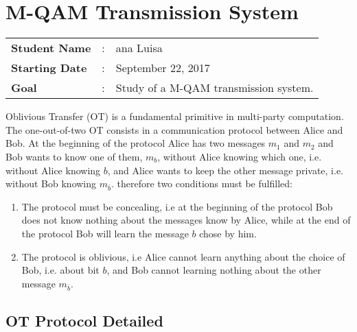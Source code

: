 \clearpage
\section{M-QAM Transmission System}

\begin{tcolorbox}	
\begin{tabular}{p{2.75cm} p{0.2cm} p{10.5cm}} 	
\textbf{Student Name}  &:& ana Luisa\\
\textbf{Starting Date} &:& September 22, 2017\\
\textbf{Goal}          &:& Study of a M-QAM transmission system.
\end{tabular}
\end{tcolorbox}

Oblivious Transfer (OT) is a fundamental primitive in multi-party computation. The one-out-of-two OT consists in a communication protocol between Alice and Bob. At the beginning of the protocol Alice has two messages $m_1$ and $m_2$ and Bob wants to know one of them, $m_b$, without Alice knowing which one, i.e. without Alice knowing $b$, and Alice wants to keep the other message private, i.e. without Bob knowing $m_{\bar{b}}$. therefore two conditions must be fulfilled:
\begin{enumerate}
	\item{The protocol must be concealing, i.e at the beginning of the protocol Bob does not know nothing about the messages know by Alice, while at the end of the protocol Bob will learn the message $b$ chose by him.}
	\item{The protocol is oblivious, i.e Alice cannot learn anything about the choice of Bob, i.e. about bit $b$, and Bob cannot learning nothing about the other message $m_{\bar{b}}$.}
\end {enumerate}

\subsection{OT Protocol Detailed}


